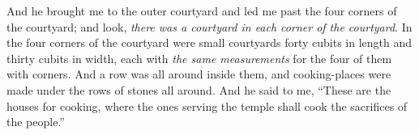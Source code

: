 \begin{biblechapter}
\verse And he brought me to the outer courtyard and led me past the four corners of the courtyard; and look, \textit{there was a courtyard in each corner of the courtyard}.
\verse In the four corners of the courtyard were small courtyards forty cubits in length and thirty cubits in width, each with \textit{the same measurements} for the four of them with corners.
\verse And a row was all around inside them, and cooking-places were made under the rows of stones all around.
\verse And he said to me, “These are the houses for cooking, where the ones serving the temple shall cook the sacrifices of the people.”
\end{biblechapter}

